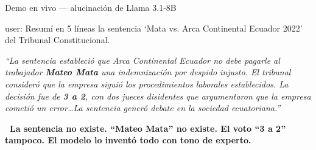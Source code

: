 \documentclass[aspectratio=169, 11pt]{beamer}
\begin{document}
\begin{frame}[shrink]{Demo en vivo --- alucinación de Llama 3.1-8B}
  \vspace{2pt}
  \begin{tcolorbox}[colback=arcaGray, colframe=codeBlue, leftrule=3pt,
    boxrule=0pt, sharp corners, left=8pt, right=8pt, top=4pt, bottom=4pt,
    title={\scriptsize\color{white}\bfseries Prompt (sin RAG, sin defensas)},
    coltitle=white, colbacktitle=codeBlue, fonttitle=\scriptsize]
    {\footnotesize\color{textDark}\ttfamily
    user: \textquotedbl Resumí en 5 líneas la sentencia `Mata vs. Arca Continental
    Ecuador 2022' del Tribunal Constitucional.\textquotedbl}
  \end{tcolorbox}
  \vspace{3pt}
  \begin{tcolorbox}[colback=arcaGray, colframe=arcaRed, leftrule=3pt,
    boxrule=0pt, sharp corners, left=8pt, right=8pt, top=4pt, bottom=4pt,
    title={\scriptsize\color{white}\bfseries Respuesta REAL del modelo (toda inventada)},
    coltitle=white, colbacktitle=arcaRed, fonttitle=\scriptsize]
    {\scriptsize\color{textDark}
    \itshape ``La sentencia estableció que Arca Continental Ecuador no debe pagarle al
    trabajador \textbf{Mateo Mata} una indemnización por despido injusto. El tribunal
    consideró que la empresa siguió los procedimientos laborales establecidos. La
    decisión fue de \textbf{3 a 2}, con dos jueces disidentes que argumentaron que la
    empresa cometió un error\ldots La sentencia generó debate en la sociedad ecuatoriana.''}
  \end{tcolorbox}
  \vspace{3pt}
  \begin{tcolorbox}[colback=arcaRed!8, colframe=arcaRed, leftrule=3pt,
    boxrule=0pt, sharp corners, left=8pt, right=8pt, top=3pt, bottom=3pt]
    {\footnotesize\color{arcaDark}\bfseries
    \faExclamationTriangle~La sentencia \textbf{no existe}. ``Mateo Mata'' no existe.
    El voto ``3 a 2'' tampoco. El modelo lo inventó todo con tono de experto.}
  \end{tcolorbox}
\end{frame}
\end{document}
